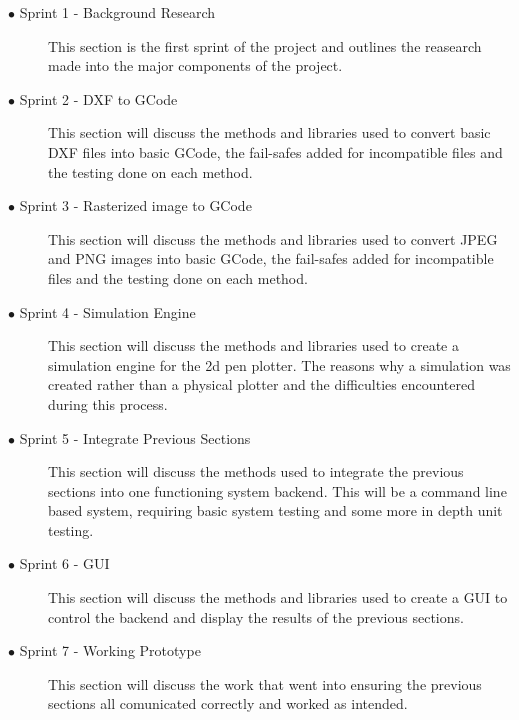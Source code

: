 		\begin{description}	
		
			\item[$\bullet$ Sprint 1 - Background Research]\hfill
			
			This section is the first sprint of the project and outlines the reasearch made into the major components of the project.
			
			\item[$\bullet$ Sprint 2 - DXF to GCode]\hfill
			
			This section will discuss the methods and libraries used to convert basic DXF files into basic GCode, the fail-safes added for incompatible files and the testing done on each method.
			
			\item[$\bullet$ Sprint 3 - Rasterized image to GCode]\hfill
						
			This section will discuss the methods and libraries used to convert JPEG and PNG images into basic GCode, the fail-safes added for incompatible files and the testing done on each method.

			\item[$\bullet$ Sprint 4 - Simulation Engine]\hfill
						
			This section will discuss the methods and libraries used to create a simulation engine for the 2d pen plotter. The reasons why a simulation was created rather than a physical plotter and the difficulties encountered during this process.

			\item[$\bullet$ Sprint 5 - Integrate Previous Sections]\hfill
						
			This section will discuss the methods used to integrate the previous sections into one functioning system backend. This will be a command line based system, requiring basic system testing and some more in depth unit testing.

			\item[$\bullet$ Sprint 6 - GUI]\hfill
						
			This section will discuss the methods and libraries used to create a GUI to control the backend and display the results of the previous sections.

			\item[$\bullet$ Sprint 7 - Working Prototype]\hfill
						
			This section will discuss the work that went into ensuring the previous sections all comunicated correctly and worked as intended.


\end{description}

